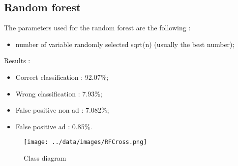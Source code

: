 \subsection{Random forest}
The parameters used for the random forest are the following :
  \begin{itemize}
    \item number of variable randomly selected sqrt(n) (usually the best number);
  \end{itemize}
Results :
\begin{itemize}
  \item Correct classification : 92.07\%;
  \item Wrong classification : 7.93\%;
  \item False positive non ad : 7.082\%;
  \item False positive ad : 0.85\%.
\end{itemize}
\begin{figure}[h]
 \centering
 \texttt{[image: ../data/images/RFCross.png]}
 \caption{Class diagram}
\end{figure}
